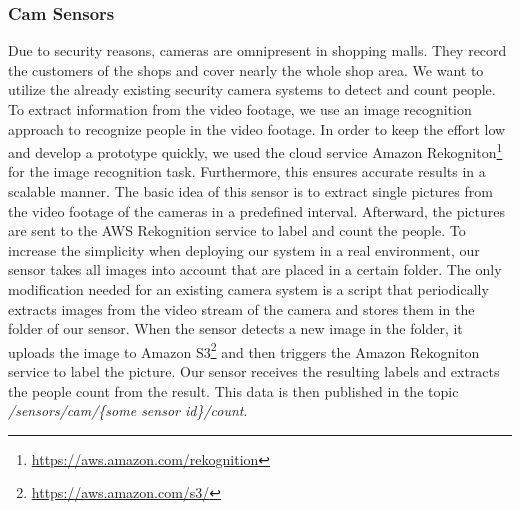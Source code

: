 \documentclass[runningheads]{llncs}
\newcommand{\topicname}[1]{\textit{#1}}
\begin{document}
\subsubsection{Cam Sensors}
\label{impl:cam-sensor}
Due to security reasons, cameras are omnipresent in shopping malls. They record the customers of the shops and cover nearly the whole shop area.
We want to utilize the already existing security camera systems to detect and count people. To extract information from the video footage, we use an image recognition approach to recognize people in the video footage. In order to keep the effort low and develop a prototype quickly, we used the cloud service Amazon Rekogniton\footnote{\url{https://aws.amazon.com/rekognition}} for the image recognition task. Furthermore, this ensures accurate results in a scalable manner.
The basic idea of this sensor is to extract single pictures from the video footage of the cameras in a predefined interval. Afterward, the pictures are sent to the AWS Rekognition service to label and count the people. 
To increase the simplicity when deploying our system in a real environment, our sensor takes all images into account that are placed in a certain folder. The only modification needed for an existing camera system is a script that periodically extracts images from the video stream of the camera and stores them in the folder of our sensor.
When the sensor detects a new image in the folder, it uploads the image to Amazon S3\footnote{\url{https://aws.amazon.com/s3/}} and then triggers the Amazon Rekogniton service to label the picture. Our sensor receives the resulting labels and extracts the people count from the result. This data is then published in the topic \topicname{/sensors/cam/\{some sensor id\}/count}.
\end{document}
